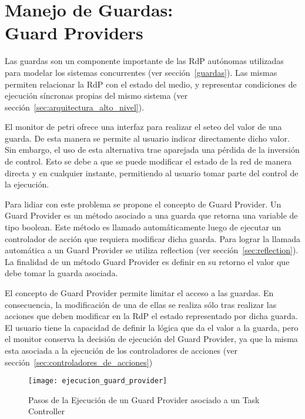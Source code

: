 \section{Manejo de Guardas: \\ Guard Providers}
\label{sec:guard_providers}
Las guardas son un componente importante de las RdP autónomas utilizadas para
modelar los sistemas concurrentes (ver
sección~\ref{guardas}). Las mismas
permiten relacionar la RdP con el estado del medio, y representar condiciones de
ejecución síncronas propias del mismo sistema (ver
sección~\ref{sec:arquitectura_alto_nivel}).

El monitor de petri ofrece una interfaz para realizar el seteo del valor
de una guarda. De esta manera se permite al usuario indicar directamente
dicho valor. Sin embargo, el uso de esta alternativa trae aparejada una pérdida
de la inversión de control. Esto se debe a que se puede modificar el estado
de la red de manera directa y en cualquier instante, permitiendo al usuario tomar
parte del control de la ejecución.

Para lidiar con este problema se propone el concepto de Guard Provider. Un Guard
Provider es un método asociado a una guarda que retorna una variable de tipo
boolean. Este método es llamado automáticamente luego de ejecutar un controlador
de acción que requiera modificar dicha guarda. Para lograr la llamada automática
a un Guard Provider se utiliza reflection (ver sección~\ref{sec:reflection}). La
finalidad de un método Guard Provider es definir en su retorno el valor que debe
tomar la guarda asociada. 

El concepto de Guard Provider permite limitar el acceso a las
guardas. En consecuencia, la modificación de una de ellas se realiza sólo tras
realizar las acciones que deben modificar en la RdP el estado representado por
dicha guarda. El usuario tiene la capacidad de definir la lógica que da el
valor a la guarda, pero el monitor conserva la decisión de ejecución del Guard
Provider, ya que la misma esta asociada a la ejecución de los controladores de acciones (ver
sección~\ref{sec:controladores_de_acciones})

\begin{figure}[H]
	\centering
	\texttt{[image: ejecucion\_guard\_provider]}
	\caption{Pasos de la Ejecución de un Guard Provider asociado a un Task
	Controller }
	\label{fig:ejecucion_guard_provider}
\end{figure}